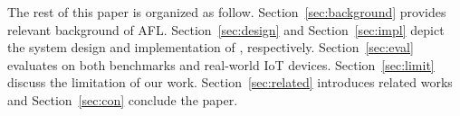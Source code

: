 
% 
% 
 

The rest of this paper is organized as follow. Section~\ref{sec:background} provides relevant background of AFL. Section~\ref{sec:design} and Section~\ref{sec:impl} depict the system design and implementation of \sysname, respectively. Section~\ref{sec:eval} evaluates \sysname on both benchmarks and real-world IoT devices. Section~\ref{sec:limit} discuss the limitation of our work. Section~\ref{sec:related} introduces related works and Section~\ref{sec:con} conclude the paper.





%








